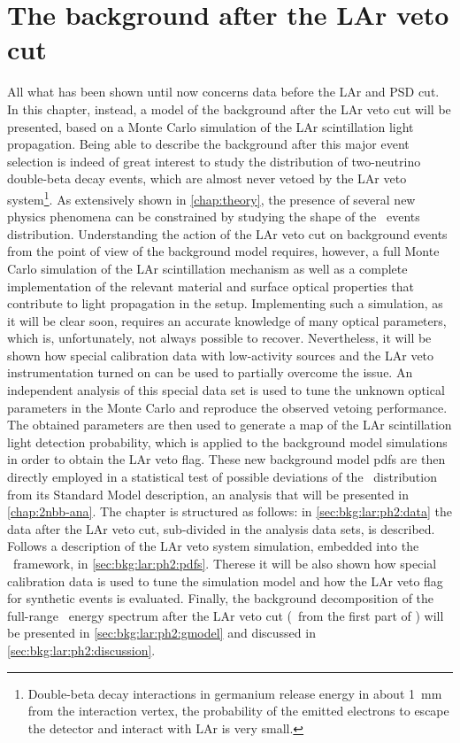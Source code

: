 
\chapter{The background after the LAr veto cut}%
\label{chap:bkg:lar:ph2}

All what has been shown until now concerns data before the LAr and PSD cut. In this
chapter, instead, a model of the background after the LAr veto cut will be presented,
based on a Monte Carlo simulation of the LAr scintillation light propagation. Being able
to describe the background after this major event selection is indeed of great interest to
study the distribution of two-neutrino double-beta decay events, which are almost never
vetoed by the LAr veto system\footnote{%
  Double-beta decay interactions in germanium release energy in about 1~mm from the
  interaction vertex, the probability of the emitted electrons to escape the detector and
  interact with LAr is very small.
}. As extensively shown in \cref{chap:theory}, the presence of several new physics
phenomena can be constrained by studying the shape of the \nnbb\ events distribution.
Understanding the action of the LAr veto cut on background events from the point of view
of the background model requires, however, a full Monte Carlo simulation of the LAr
scintillation mechanism as well as a complete implementation of the relevant material and
surface optical properties that contribute to light propagation in the setup.
Implementing such a simulation, as it will be clear soon, requires an accurate knowledge
of many optical parameters, which is, unfortunately, not always possible to recover.
Nevertheless, it will be shown how special calibration data with low-activity sources and
the LAr veto instrumentation turned on can be used to partially overcome the issue. An
independent analysis of this special data set is used to tune the unknown optical
parameters in the Monte Carlo and reproduce the observed vetoing performance.  The
obtained parameters are then used to generate a map of the LAr scintillation light
detection probability, which is applied to the background model simulations in order to
obtain the LAr veto flag. These new background model pdfs are then directly employed in a
statistical test of possible deviations of the \nnbb\ distribution from its Standard Model
description, an analysis that will be presented in \cref{chap:2nbb-ana}.
\newpar
The chapter is structured as follows: in \cref{sec:bkg:lar:ph2:data} the data after the
LAr veto cut, sub-divided in the analysis data sets, is described. Follows a description
of the LAr veto system simulation, embedded into the \mage\ framework, in
\cref{sec:bkg:lar:ph2:pdfs}. Therese it will be also shown how special calibration data is
used to tune the simulation model and how the LAr veto flag for synthetic events is
evaluated. Finally, the background decomposition of the full-range \gerda\ energy spectrum
after the LAr veto cut (\gexpophasetwobkg\ from the first part of \phasetwo) will be
presented in \cref{sec:bkg:lar:ph2:gmodel} and discussed in
\cref{sec:bkg:lar:ph2:discussion}.

